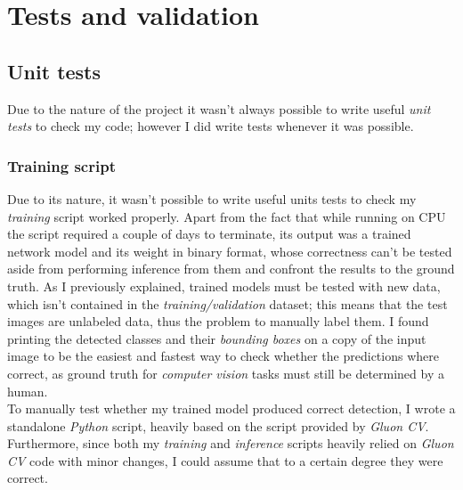
\chapter{Tests and validation}
\label{cap:test-validation}

\section{Unit tests}
Due to the nature of the project it wasn't always possible to write useful \emph{unit tests} to check my code; however I did write tests whenever it was possible.

\subsection{Training script}
Due to its nature, it wasn't possible to write useful units tests to check my \emph{training} script worked properly. Apart from the fact that while running on CPU the script required a couple of days to terminate, its output was a trained network model and its weight in binary format, whose correctness can't be tested aside from performing inference from them and confront the results to the ground truth. As I previously explained, trained models must be tested with new data, which isn't contained in the \emph{training/validation} dataset; this means that the test images are unlabeled data, thus the problem to manually label them. I found printing the detected classes and their \emph{bounding boxes} on a copy of the input image to be the easiest and fastest way to check whether the predictions where correct, as ground truth for \emph{computer vision} tasks must still be determined by a human. \\
To manually test whether my trained model produced correct detection, I wrote a standalone \emph{Python} script, heavily based on the script provided by \emph{Gluon CV}. \\
Furthermore, since both my \emph{training} and \emph{inference} scripts heavily relied on \emph{Gluon CV} code with minor changes, I could assume that to a certain degree they were correct.

